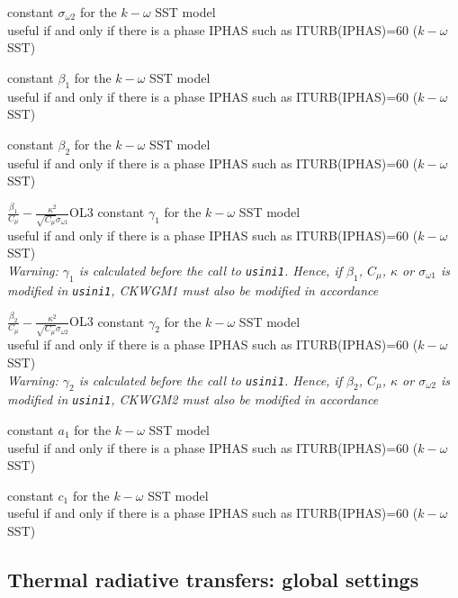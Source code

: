 {constant $\sigma_{\omega 2}$ for the $k-\omega$ SST model\\
useful if and only if there is a phase IPHAS such as ITURB(IPHAS)=60
($k-\omega$ SST)}

{constant $\beta_1$ for the $k-\omega$ SST model\\
useful if and only if there is a phase IPHAS such as ITURB(IPHAS)=60
($k-\omega$ SST)}

{constant $\beta_2$ for the $k-\omega$ SST model\\
useful if and only if there is a phase IPHAS such as ITURB(IPHAS)=60
($k-\omega$ SST)}

{$\frac{\beta_1}{C_\mu}-\frac{\kappa^2}{\sqrt{C_\mu}\sigma_{\omega 1}}$}{O}{L3}
{constant $\gamma_1$ for the $k-\omega$ SST model\\
useful if and only if there is a phase IPHAS such as ITURB(IPHAS)=60
($k-\omega$ SST)\\
{\em Warning: $\gamma_1$ is calculated before the call to
\texttt{usini1}. Hence, if $\beta_1$, $C_\mu$, $\kappa$ or $\sigma_{\omega 1}$
is modified in \texttt{usini1}, CKWGM1 must also be modified in accordance}}

{$\frac{\beta_2}{C_\mu}-\frac{\kappa^2}{\sqrt{C_\mu}\sigma_{\omega 2}}$}{O}{L3}
{constant $\gamma_2$ for the $k-\omega$ SST model\\
useful if and only if there is a phase IPHAS such as ITURB(IPHAS)=60
($k-\omega$ SST)\\
{\em Warning: $\gamma_2$ is calculated before the call to
\texttt{usini1}. Hence, if $\beta_2$, $C_\mu$, $\kappa$ or $\sigma_{\omega 2}$
is modified in \texttt{usini1}, CKWGM2 must also be modified in accordance}}

{constant $a_1$ for the $k-\omega$ SST model\\
useful if and only if there is a phase IPHAS such as ITURB(IPHAS)=60
($k-\omega$ SST)}

{constant $c_1$ for the $k-\omega$ SST model\\
useful if and only if there is a phase IPHAS such as ITURB(IPHAS)=60
($k-\omega$ SST)}


\subsection{Thermal radiative transfers: global settings}


